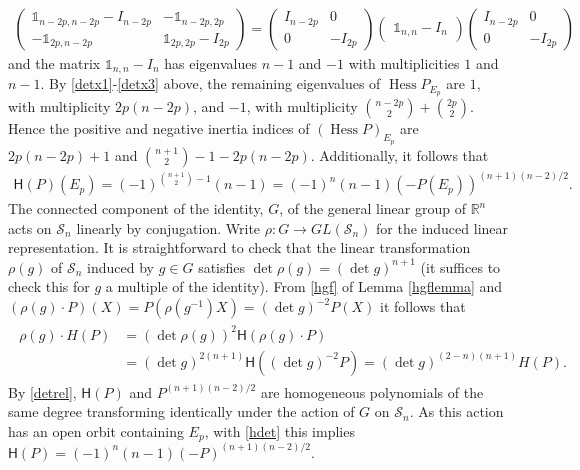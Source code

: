 \documentclass [leqno, 10pt]{amsart}
\theoremstyle{definition}
\numberwithin{equation}{section}
\newcommand{\one}{\mathbb{1}}
\newcommand{\sm}{\mathscr{S}}
\renewcommand{\H}{\mathsf{H}}
\newcommand{\hess}{\operatorname{Hess}}
\newcommand{\rea}{\mathbb R}
\begin{document}
\begin{example}
\begin{align}
\begin{pmatrix}
\one_{n-2p, n-2p} - I_{n-2p} & -\one_{n-2p, 2p}\\
-\one_{2p, n-2p}&\one_{2p, 2p} - I_{2p}
\end{pmatrix} = \begin{pmatrix}
I_{n-2p} & 0\\
0& - I_{2p}
\end{pmatrix}  \begin{pmatrix}
\one_{n, n} - I_{n}
\end{pmatrix}\begin{pmatrix}
I_{n-2p} & 0\\
0& - I_{2p}
\end{pmatrix}
\end{align}
and the matrix $\one_{n, n} - I_{n}$ has eigenvalues $n-1$ and $-1$ with multiplicities $1$ and $n-1$. By \ref{detx1}-\ref{detx3} above, the remaining eigenvalues of $\hess P_{E_{p}}$ are $1$, with multiplicity $2p(n-2p)$, and $-1$, with multiplicity $\binom{n-2p}{2} + \binom{2p}{2}$. Hence the positive and negative inertia indices of $(\hess P)_{E_{p}}$ are $2p(n-2p) + 1$ and $\binom{n+1}{2} -1 - 2p(n-2p)$. Additionally, it follows that 
\begin{align}\label{hdet}
\H(P)(E_{p}) = (-1)^{\binom{n+1}{2}-1}(n-1) = (-1)^{n}(n-1)(-P(E_{p}))^{(n+1)(n-2)/2}.
\end{align} 
The connected component of the identity, $G$, of the general linear group of $\rea^{n}$ acts on $\sm_{n}$ linearly by conjugation. Write $\rho: G \to GL(\sm_{n})$ for the induced linear representation. It is straightforward to check that the linear transformation $\rho(g)$ of $\sm_{n}$ induced by $g \in G$ satisfies $\det \rho(g) = (\det g)^{n+1}$ (it suffices to check this for $g$ a multiple of the identity). From \eqref{hgf} of Lemma \ref{hgflemma} and $(\rho(g)\cdot P)(X) = P(\rho(g^{-1})X) = (\det g)^{-2}P(X)$ it follows that
\begin{align}\label{detrel}
\begin{split}
\rho(g)\cdot H(P) &= (\det \rho(g))^{2}\H(\rho(g)\cdot P) \\&= (\det g)^{2(n+1)}\H((\det g)^{-2}P) = (\det g)^{(2-n)(n+1)}H(P).
\end{split}
\end{align}  
By \eqref{detrel}, $\H(P)$ and $P^{(n+1)(n-2)/2}$ are homogeneous polynomials of the same degree transforming identically under the action of $G$ on $\sm_{n}$. As this action has an open orbit containing $E_{p}$, with \eqref{hdet} this implies $\H(P) =  (-1)^{n}(n-1)(-P)^{(n+1)(n-2)/2}$. 


\end{example}
\end{document}
